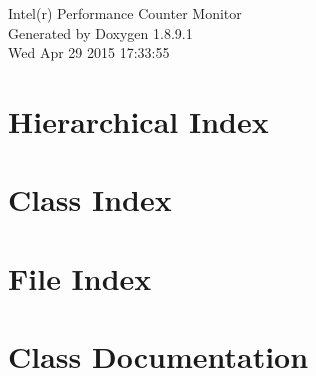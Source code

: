 \documentclass[twoside]{book}
\newcommand{\+}{\discretionary{\mbox{\scriptsize$\hookleftarrow$}}{}{}}
\newcommand{\clearemptydoublepage}{%
  \newpage{\pagestyle{empty}\cleardoublepage}%
}
\begin{document}
\begin{titlepage}
\vspace*{7cm}
\begin{center}%
{\Large Intel(r) Performance Counter Monitor }\\
\vspace*{1cm}
{\large Generated by Doxygen 1.8.9.1}\\
\vspace*{0.5cm}
{\small Wed Apr 29 2015 17:33:55}\\
\end{center}
\end{titlepage}
\clearemptydoublepage
\tableofcontents
\clearemptydoublepage
{}

\chapter{Hierarchical Index}

\chapter{Class Index}

\chapter{File Index}

\chapter{Class Documentation}








































\end{document}

